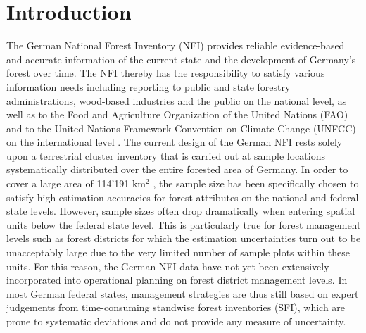 \documentclass[remotesensing,article,submit,moreauthors,pdftex,10pt,a4paper]{mdpi}
\begin{document}



\section{Introduction}
\label{sec:intro}

The German National Forest Inventory (NFI) provides reliable evidence-based and accurate information of the current state and the development of Germany's forest over time. The NFI thereby has the responsibility to satisfy various information needs including reporting to public and state forestry administrations, wood-based industries and the public on the national level, as well as to the Food and Agriculture Organization of the United Nations (FAO) and to the United Nations Framework Convention on Climate Change (UNFCC) on the international level \citep{polley2010intomppo}. The current design of the German NFI rests solely upon a terrestrial cluster inventory that is carried out at sample locations systematically distributed over the entire forested area of Germany. In order to cover a large area of 114'191 km$^2$ \citep{bwi3}, the sample size has been specifically chosen to satisfy high estimation accuracies for forest attributes on the national and federal state levels. However, sample sizes often drop dramatically when entering spatial units below the federal state level. This is particularly true for forest management levels such as forest districts for which the estimation uncertainties turn out to be unacceptably large due to the very limited number of sample plots within these units. For this reason, the German NFI data have not yet been extensively incorporated into operational planning on forest district management levels. In most German federal states, management strategies are thus still based on expert judgements from time-consuming standwise forest inventories (SFI), which are prone to systematic deviations \cite{kulievsis2016} and do not provide any measure of uncertainty.\par
\end{document}
